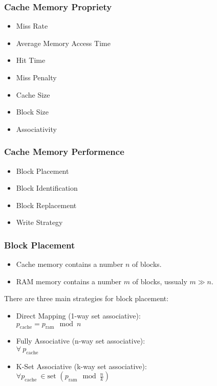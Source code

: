 \begin{frame}
    \frametitle{Cache Memory Propriety}
    \begin{itemize}
        \item Miss Rate
        \item Average Memory Access Time
        \item Hit Time
        \item Miss Penalty
        \item Cache Size
        \item Block Size
        \item Associativity
    \end{itemize}
\end{frame}

\begin{frame}
    \frametitle{Cache Memory Performence}
    \begin{itemize}
        \item Block Placement
        \item Block Identification
        \item Block Replacement
        \item Write Strategy
    \end{itemize}
\end{frame}

\begin{frame}
    \frametitle{Block Placement}
    \begin{itemize}
        \item Cache memory contains a number $n$ of blocks.
        \item RAM memory contains a number $m$ of blocks, ussualy $m \gg n$.
    \end{itemize}
    There are three main strategies for block placement:
    \begin{itemize}
        \item Direct Mapping (1-way set associative):\\
        $p_{\text{cache}}=p_{\text{ram}} \mod n$
        \item Fully Associative (n-way set associative):\\
        $ \forall \ p_{\text{cache}}$
        \item K-Set Associative (k-way set associative):\\
        $\forall p_{\text{cache}} \ \in \text{set } (p_{\text{ram}} \mod \frac{n}{k})$
    \end{itemize}
\end{frame}

